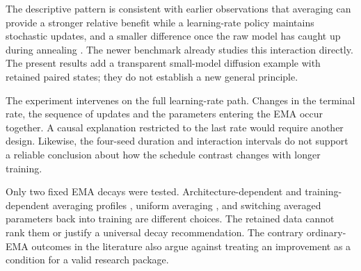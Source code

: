 The descriptive pattern is consistent with earlier observations that
averaging can provide a stronger relative benefit while a learning-rate
policy maintains stochastic updates, and a smaller difference once the raw
model has caught up during annealing \cite{MoralesBrotons2024,Ajroldi2025}.
The newer benchmark already studies this interaction directly. The present
results add a transparent small-model diffusion example with retained paired
states; they do not establish a new general principle.

The experiment intervenes on the full learning-rate path. Changes in the
terminal rate, the sequence of updates and the parameters entering the EMA
occur together. A causal explanation restricted to the last rate would
require another design. Likewise, the four-seed duration and interaction
intervals do not support a reliable conclusion about how the schedule
contrast changes with longer training.

Only two fixed EMA decays were tested. Architecture-dependent and
training-dependent averaging profiles \cite{Karras2024}, uniform averaging
\cite{Izmailov2018}, and switching averaged parameters back into training
\cite{Li2024} are different choices. The retained data cannot rank them or
justify a universal decay recommendation. The contrary ordinary-EMA
outcomes in the literature also argue against treating an improvement as a
condition for a valid research package.
